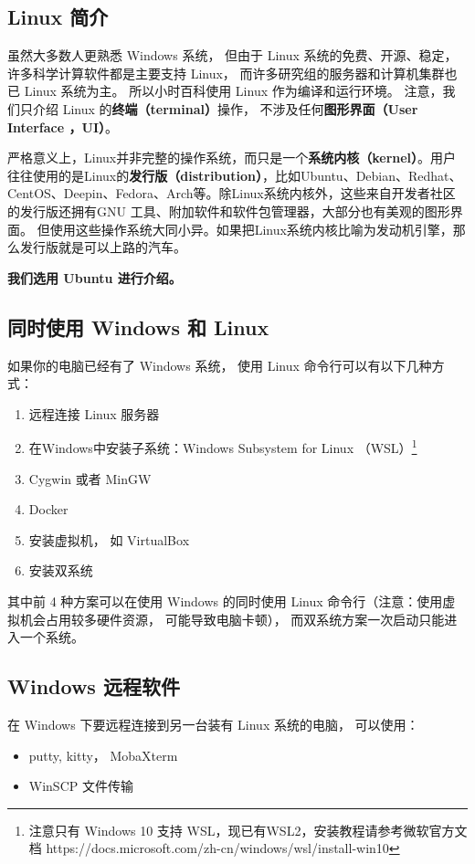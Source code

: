 
\begin{issues}
\issueTODO
\end{issues}

\subsection{Linux 简介}
虽然大多数人更熟悉 Windows 系统， 但由于 Linux 系统的免费、开源、稳定， 许多科学计算软件都是主要支持 Linux， 而许多研究组的服务器和计算机集群也已 Linux 系统为主。 所以小时百科使用 Linux 作为编译和运行环境。 注意，我们只介绍 Linux 的\textbf{终端（terminal）}操作， 不涉及任何\textbf{图形界面（User Interface ，UI）}。 

严格意义上，Linux并非完整的操作系统，而只是一个\textbf{系统内核（kernel）}。用户往往使用的是Linux的\textbf{发行版（distribution）}，比如Ubuntu、Debian、Redhat、CentOS、Deepin、Fedora、Arch等。除Linux系统内核外，这些来自开发者社区的发行版还拥有GNU 工具、附加软件和软件包管理器，大部分也有美观的图形界面。 但使用这些操作系统大同小异。如果把Linux系统内核比喻为发动机引擎，那么发行版就是可以上路的汽车。

\textbf{我们选用 Ubuntu 进行介绍。}


\subsection{同时使用 Windows 和 Linux}
如果你的电脑已经有了 Windows 系统， 使用 Linux 命令行可以有以下几种方式：
\begin{enumerate}
\item 远程连接 Linux 服务器
\item 在Windows中安装子系统：Windows Subsystem for Linux （WSL）\footnote{注意只有 Windows 10 支持 WSL，现已有WSL2，安装教程请参考微软官方文档 https://docs.microsoft.com/zh-cn/windows/wsl/install-win10} 
\item Cygwin 或者 MinGW
\item Docker
\item 安装虚拟机， 如 VirtualBox
\item 安装双系统
\end{enumerate}
其中前 4 种方案可以在使用 Windows 的同时使用 Linux 命令行（注意：使用虚拟机会占用较多硬件资源， 可能导致电脑卡顿）， 而双系统方案一次启动只能进入一个系统。

\subsection{Windows 远程软件}
在 Windows 下要远程连接到另一台装有 Linux 系统的电脑， 可以使用：
\begin{itemize}
\item putty, kitty， MobaXterm
\item WinSCP 文件传输
\end{itemize}


